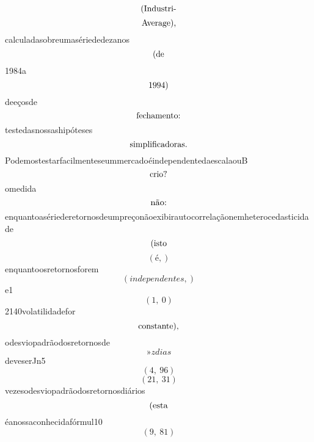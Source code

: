 \documentclass{article}
\begin{document}
\begin{equation}
$(Industri-$
\end{equation}\begin{equation}
$Average),$
\end{equation}calculadasobreumasériededezanos\begin{equation}
$(de$
\end{equation}1984a\begin{equation}
$1994)$
\end{equation}deeçosde\begin{equation}
$fechamento:$
\end{equation}testedasnossashipóteses\begin{equation}
$simplificadoras.$
\end{equation}PodemostestarfacilmenteseummercadoéindependentedaescalaouB\begin{equation}
$crio?$
\end{equation}omedida\begin{equation}
$não:$
\end{equation}enquantoasériederetornosdeumpreçonãoexibirautocorrelaçãonemheterocedasticidade\begin{equation}
$(isto$
\end{equation}\begin{equation}
\left( é,\right)
\end{equation}enquantoosretornosforem\begin{equation}
\left( independentes,\right)
\end{equation}e1\begin{equation}
\left( 1, \  0\right)
\end{equation}2140volatilidadefor\begin{equation}
$constante),$
\end{equation}odesviopadrãodosretornosde\begin{equation}
»zdias
\end{equation}deveserJn5\begin{equation}
\left( 4, \  96\right)
\end{equation}\begin{equation}
\left( 21, \  31\right)
\end{equation}vezesodesviopadrãodosretornosdiários\begin{equation}
$(esta$
\end{equation}éanossaconhecidafórmul10\begin{equation}
\left( 9, \  81\right)
\end{equation}\begin{equation}

\end{equation}
\end{document}
